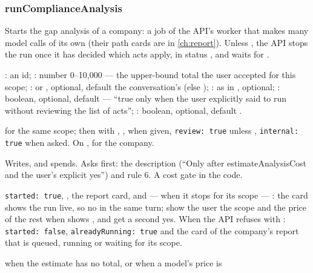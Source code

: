 \subsubsection{runComplianceAnalysis}\label{sec:tools:runComplianceAnalysis}
\begin{description}[style=multiline, leftmargin=19mm, labelwidth=17mm, labelsep=2mm,
  font=\sffamily\bfseries\footnotesize\color{ink}, itemsep=1pt, topsep=2pt, before=\raggedright]
  \item[Does] Starts the gap analysis of a company: a job of the API's worker that makes many
    model calls of its own (their path cards are in \cref{ch:report}). Unless
    , the API stops the run once it has decided which acts apply, in status
    , and waits for .
  \item[Input] : an id; : number 0--10,000 --- the
    upper-bound total the user accepted for this scope; :  or
    , optional, default the conversation's (else );
    : as in , optional; :
    boolean, optional, default  --- \enquote{true only when the user explicitly
    said to run without reviewing the list of acts}; : boolean,
    optional, default .
  \item[Calls]  for the same scope; then
     with , ,  when
    given, \texttt{review: true} unless , \texttt{internal: true} when asked.
    On ,  for the company.
  \item[Kind] Writes, and spends. Asks first: the description (\enquote{Only after
    estimateAnalysisCost and the user's explicit yes}) and rule 6. A cost gate in the code.
  \item[Returns] \texttt{started: true}, , the report card, and --- when it
    stops for its scope --- : the card shows the run live, so no  in
    the same turn; show the user the scope and the price of the rest when 
    shows , and get a second yes. When the API
    refuses with : \texttt{started: false}, \texttt{alreadyRunning: true} and
    the card of the company's report that is queued, running or waiting for its scope.
  \item[Errors]  when the estimate has no total, or when a model's price is

\end{description}
